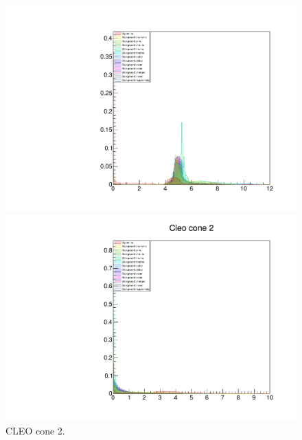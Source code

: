 \documentclass[12pt]{thesis}  %
\begin{document}
\begin{figure}[h]
\centering
\begin{minipage}{.475\textwidth}
  \centering
  \includegraphics[width=\linewidth]{images/tauMG-cc1.pdf}
  \caption[]%
  {{\small CLEO cone 1.}}
  \label{fig:tauMG cleo cone 1}
\end{minipage}%
\hfill
\begin{minipage}{.475\textwidth}
  \centering
  \includegraphics[width=\linewidth]{images/tauMG-cc2.pdf}
  \caption[]%
  {{\small CLEO cone 2.}}
  \label{fig:tauMG cleo cone 2}
\end{minipage}
\end{figure}
\end{document}
